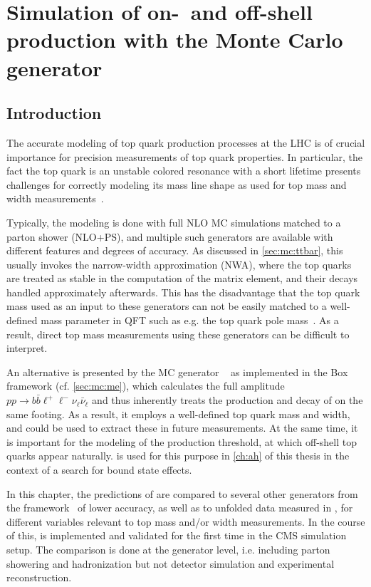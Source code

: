 \chapter{Simulation of on-~and off-shell \ttbartitle production with the Monte Carlo generator \texorpdfstring{\bbfourl}{bb4l}}
\label{ch:bb4l}

\section{Introduction}

The accurate modeling of top quark production processes at the LHC is of crucial importance for precision measurements of top quark properties. In particular, the fact the top quark is an unstable colored resonance with a short lifetime presents challenges for correctly modeling its mass line shape as used for top mass and width measurements~\cite{Tarrach:1980up,Smith:1996xz,Hoang:2020iah}.

Typically, the modeling is done with full NLO MC simulations matched to a parton shower (NLO+PS), and multiple such generators are available with different features and degrees of accuracy. As discussed in \cref{sec:mc:ttbar}, this usually invokes the narrow-width approximation (NWA), where the top quarks are treated as stable in the computation of the matrix element, and their decays handled approximately afterwards. This has the disadvantage that the top quark mass used as an input to these generators can not be easily matched to a well-defined mass parameter in QFT such as e.g. the top quark pole mass~\cite{Hoang:2020iah}. As a result, direct top mass measurements using these generators can be difficult to interpret.

An alternative is presented by the MC generator \bbfourl ~\cite{Jezo:2016ujg} as implemented in the \powheg Box framework (cf. \cref{sec:mc:me}), which calculates the full amplitude $pp \to b \bar{b} \ell^+ \ell^- \nu_\ell \bar{\nu}_\ell$ and thus inherently treats the production and decay of \ttbar on the same footing. As a result, it employs a well-defined top quark mass and width, and could be used to extract these in future measurements. At the same time, it is important for the modeling of the \ttbar production threshold, at which off-shell top quarks appear naturally. \bbfourl is used for this purpose in \cref{ch:ah} of this thesis in the context of a search for \ttbar bound state effects.

In this chapter, the predictions of \bbfourl are compared to several other generators from the \powheg framework~\cite{Powheg:2004,Powheg:2007} of lower accuracy, as well as to unfolded data measured in , for different variables relevant to top mass and/or width measurements. In the course of this, \bbfourl is implemented and validated for the first time in the CMS simulation setup. The comparison is done at the generator level, i.e. including parton showering and hadronization but not detector simulation and experimental reconstruction.

